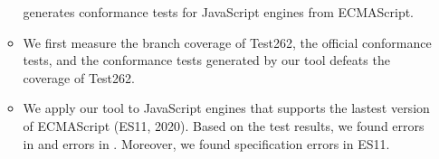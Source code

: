 \begin{itemize}
\begin{itemize}
        generates conformance tests for JavaScript engines from ECMAScript.
      \item We first measure the branch coverage of Test262, the official
        conformance tests, and the conformance tests generated by our tool
        defeats the coverage of Test262.
      \item We apply our tool to  JavaScript engines that supports the
        lastest version of ECMAScript (ES11, 2020).  Based on the test results,
        we found  errors in  and  errors in
        . Moreover, we found  specification errors in
        ES11.
    \end{itemize}
\end{itemize}
